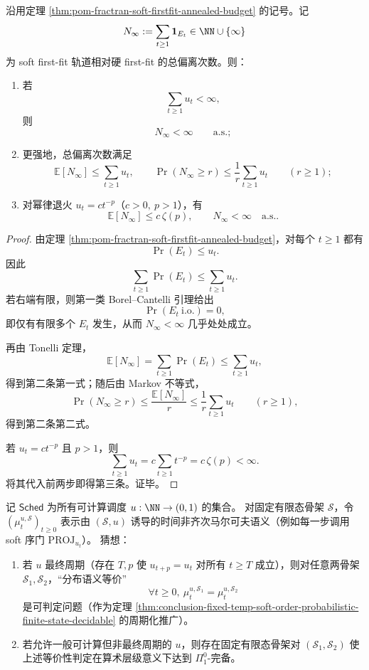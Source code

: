 \begin{theorem}\label{thm:conclusion-soft-firstfit-summable-budget-finite-deviation}
沿用定理 \ref{thm:pom-fractran-soft-firstfit-annealed-budget} 的记号。记
\[
N_\infty:=\sum_{t\ge 1}\mathbf 1_{E_t}\in\NN\cup\{\infty\}
\]
为 soft first-fit 轨道相对硬 first-fit 的总偏离次数。则：
\begin{enumerate}
\normalfont
  \item 若
  \[
  \sum_{t\ge 1}u_t<\infty,
  \]
  则
  \[
  N_\infty<\infty
  \qquad\text{a.s.};
  \]
  \item 更强地，总偏离次数满足
  \[
  \mathbb E[N_\infty]\le \sum_{t\ge 1}u_t,
  \qquad
  \Pr(N_\infty\ge r)\le \frac{1}{r}\sum_{t\ge 1}u_t
  \qquad(r\ge 1);
  \]
  \item 对幂律退火 \(u_t=ct^{-p}\)（\(c>0,\ p>1\)），有
  \[
  \mathbb E[N_\infty]\le c\,\zeta(p),
  \qquad
  N_\infty<\infty\quad\text{a.s.}.
  \]
\end{enumerate}
\end{theorem}
\begin{proof}
由定理 \ref{thm:pom-fractran-soft-firstfit-annealed-budget}，对每个 \(t\ge 1\) 都有
\[
\Pr(E_t)\le u_t.
\]
因此
\[
\sum_{t\ge 1}\Pr(E_t)\le \sum_{t\ge 1}u_t.
\]
若右端有限，则第一类 Borel--Cantelli 引理给出
\[
\Pr(E_t\ \mathrm{i.o.})=0,
\]
即仅有有限多个 \(E_t\) 发生，从而 \(N_\infty<\infty\) 几乎处处成立。

再由 Tonelli 定理，
\[
\mathbb E[N_\infty]
=
\sum_{t\ge 1}\Pr(E_t)
\le
\sum_{t\ge 1}u_t,
\]
得到第二条第一式；随后由 Markov 不等式，
\[
\Pr(N_\infty\ge r)\le \frac{\mathbb E[N_\infty]}{r}
\le
\frac{1}{r}\sum_{t\ge 1}u_t
\qquad (r\ge 1),
\]
得到第二条第二式。

若 \(u_t=ct^{-p}\) 且 \(p>1\)，则
\[
\sum_{t\ge 1}u_t=c\sum_{t\ge 1}t^{-p}=c\,\zeta(p)<\infty.
\]
将其代入前两步即得第三条。证毕。
\end{proof}

\begin{conjecture}\label{conj:conclusion-eventually-periodic-schedule-frontier}
记 \(\mathsf{Sched}\) 为所有可计算调度 \(u:\NN\to(0,1)\) 的集合。
对固定有限态骨架 \(\mathcal S\)，令 \((\mu_t^{u,\mathcal S})_{t\ge 0}\) 表示由 \((\mathcal S,u)\) 诱导的时间非齐次马尔可夫语义（例如每一步调用 soft 序门 \(\mathrm{PROJ}_{u_t}\)）。
猜想：
\begin{enumerate}
\normalfont
  \item 若 \(u\) 最终周期（存在 \(T,p\) 使 \(u_{t+p}=u_t\) 对所有 \(t\ge T\) 成立），则对任意两骨架 \(\mathcal S_1,\mathcal S_2\)，“分布语义等价”
  \[
  \forall t\ge 0,\ \mu_t^{u,\mathcal S_1}=\mu_t^{u,\mathcal S_2}
  \]
  是可判定问题（作为定理 \ref{thm:conclusion-fixed-temp-soft-order-probabilistic-finite-state-decidable} 的周期化推广）。
  \item 若允许一般可计算但非最终周期的 \(u\)，则存在固定有限态骨架对 \((\mathcal S_1,\mathcal S_2)\) 使上述等价性判定在算术层级意义下达到 \(\Pi^0_1\)-完备。
\end{enumerate}
\end{conjecture}

\endinput
